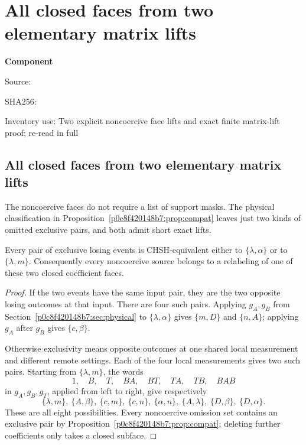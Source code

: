 \chapter{All closed faces from two elementary matrix lifts}
\label{component:pd9a6195f0af3}
\noindent\textbf{Component }\par
{\small\noindent Source: \par}
{\small\noindent SHA256: \par}
{\small\noindent Inventory use: Two explicit noncoercive face lifts and exact finite matrix-lift proof; re-read in full\par}
\medskip
\section{All closed faces from two elementary matrix lifts}
\label{pd9a6195f0af3:sec:closed-faces-short}

The noncoercive faces do not require a list of support masks. The
physical classification in Proposition~\ref{p0c8f420148b7:prop:compat} leaves just
two kinds of omitted exclusive pairs, and both admit short exact lifts.

\begin{lemma}
\label{pd9a6195f0af3:lem:closed-face-orbits}
Every pair of exclusive losing events is CHSH-equivalent either to
$\{\lambda,\alpha\}$ or to $\{\lambda,m\}$. Consequently every
noncoercive source belongs to a relabeling of one of these two closed
coefficient faces.
\end{lemma}
\begin{proof}
If the two events have the same input pair, they are the two opposite
losing outcomes at that input. There are four such pairs. Applying
$g_A,g_B$ from Section~\ref{p0c8f420148b7:sec:physical} to
$\{\lambda,\alpha\}$ gives $\{m,D\}$ and $\{n,A\}$; applying
$g_A$ after $g_B$ gives $\{c,\beta\}$.

Otherwise exclusivity means opposite outcomes at one shared local
measurement and different remote settings. Each of the four local
measurements gives two such pairs. Starting from $\{\lambda,m\}$,
the words
\[
 1,\quad B,\quad T,\quad BA,\quad BT,\quad TA,\quad TB,\quad BAB
\]
in $g_A,g_B,g_T$, applied from left to right, give respectively
\[
 \{\lambda,m\},\ \{A,\beta\},\ \{c,m\},\ \{c,n\},\
 \{\alpha,n\},\ \{A,\lambda\},\ \{D,\beta\},\ \{D,\alpha\}.
\]
These are all eight possibilities. Every noncoercive omission set
contains an exclusive pair by Proposition~\ref{p0c8f420148b7:prop:compat}; deleting
further coefficients only takes a closed subface.
\end{proof}

